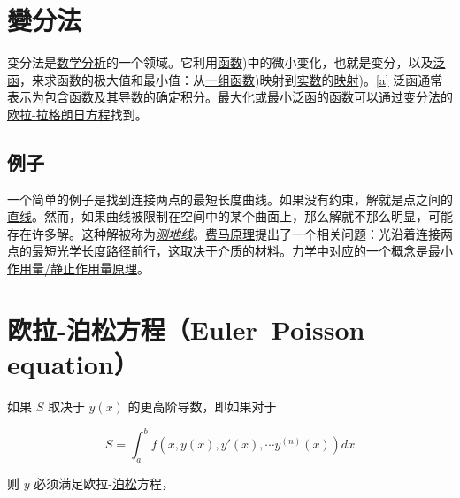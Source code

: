 \section{變分法}

变分法是\href{https://en.wikipedia.org/wiki/Mathematical_analysis}{数学分析}的一个领域。它利用\href{https://en.wikipedia.org/wiki/Function_(mathematics}{函数})中的微小变化，也就是变分，以及\href{https://en.wikipedia.org/wiki/Functional_(mathematics}{泛函}，来求函数的极大值和最小值：从\href{https://en.wikipedia.org/wiki/Function_(mathematics}{一组函数})映射到\href{https://en.wikipedia.org/wiki/Real_number}{实数}的\href{https://en.wikipedia.org/wiki/Map_(mathematics}{映射})。\href{https://en.wikipedia.org/wiki/Calculus_of_variations#cite_note-2}{[a]} 泛函通常表示为包含函数及其\href{https://en.wikipedia.org/wiki/Derivative}{导}数的\href{https://en.wikipedia.org/wiki/Definite_integral}{确定积分}。最大化或最小泛函的函数可以通过变分法的\href{https://en.wikipedia.org/wiki/Euler–Lagrange_equation}{欧拉-拉格朗日方程}找到。

\subsection{例子}

一个简单的例子是找到连接两点的最短长度曲线。如果没有约束，解就是点之间的\href{https://en.wikipedia.org/wiki/Straight_line}{直线}。然而，如果曲线被限制在空间中的某个曲面上，那么解就不那么明显，可能存在许多解。这种解被称为\emph{\href{https://en.wikipedia.org/wiki/Geodesic}{测地线}}。\href{https://en.wikipedia.org/wiki/Fermat's_principle}{费马原理}提出了一个相关问题：光沿着连接两点的最短\href{https://en.wikipedia.org/wiki/Optical_length}{光学长度}路径前行，这取决于介质的材料。\href{https://en.wikipedia.org/wiki/Mechanics}{力学}中对应的一个概念是\href{https://en.wikipedia.org/wiki/Principle_of_least_action}{最小作用量/静止作用量原理}。

\section{欧拉-泊松方程（Euler–Poisson equation）}

如果 \(S\) 取决于 \(y(x)\) 的更高阶导数，即如果对于

\[
S=\int_a^b{f(x,y(x),y'(x),\cdots y^{(n)}(x))}dx
\]

则 \(y\) 必须满足欧拉-\href{https://en.wikipedia.org/wiki/Siméon_Denis_Poisson}{泊松}方程，

